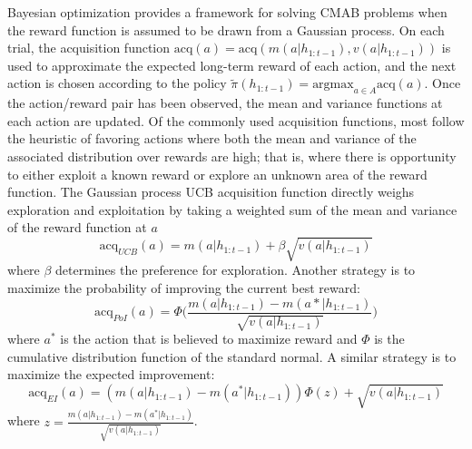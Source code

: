 \documentclass[10pt,letterpaper]{article}
\begin{document}
	Bayesian optimization \citep{Snoek} provides a framework for solving CMAB problems when the reward function is assumed to be drawn from a Gaussian process. On each trial, the acquisition function $\text{acq}(a) = \text{acq}(m(a|h_{1:t-1}), v(a|h_{1:t-1}))$ is used to approximate the expected long-term reward of each action, and the next action is chosen according to the policy $\tilde{\pi}(h_{1:t-1}) = \text{argmax}_{a \in A}\text{acq}(a)$. Once the action/reward pair has been observed, the mean and variance functions at each action are updated. Of the commonly used acquisition functions, most follow the heuristic of favoring actions where both the mean and variance of the associated distribution over rewards are high; that is, where there is opportunity to either exploit a known reward or explore an unknown area of the reward function. The Gaussian process UCB acquisition function directly weighs exploration and exploitation by taking a weighted sum of the mean and variance of the reward function at $a$ 
	\begin{equation}
	\text{acq}_{UCB}(a) = m(a|h_{1:t-1}) + \beta \sqrt{v(a|h_{1:t-1})}
	\end{equation}
	where $\beta$ determines the preference for exploration. Another strategy is to maximize the probability of improving the current best reward:
	\begin{equation}
	\text{acq}_{PoI}(a) = \Phi \bigg( \frac{m(a|h_{1:t-1}) -  m(a*|h_{1:t-1})}{\sqrt{v(a|h_{1:t-1})}} \bigg)
	\end{equation}
	where $a^{*}$ is the action that is believed to maximize reward and $\Phi$ is the cumulative distribution function of the standard normal. A similar strategy is to maximize the expected improvement:
	\begin{equation}
	\text{acq}_{EI}(a) = (m(a|h_{1:t-1}) -  m(a^{*}|h_{1:t-1})) \Phi(z) + \sqrt{v(a|h_{1:t-1})}
	\end{equation}
	where $z = \frac{m(a|h_{1:t-1}) -  m(a^{*}|h_{1:t-1})}{\sqrt{v(a|h_{1:t-1})}}$.
	
\end{document}
